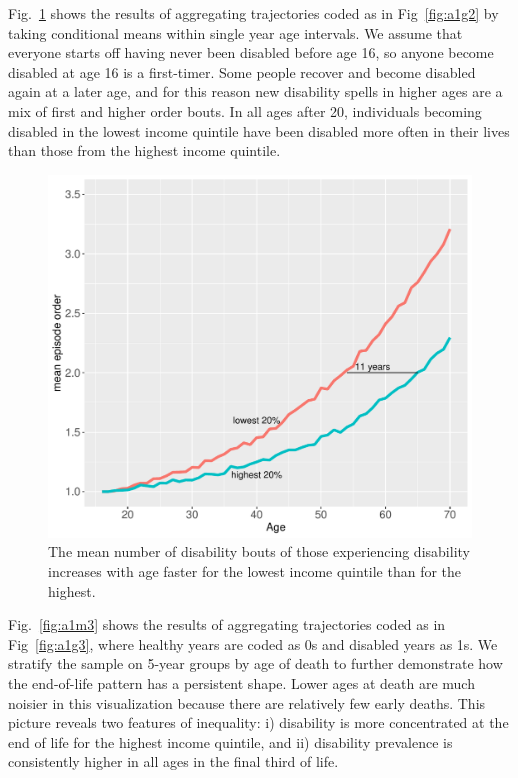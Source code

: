 \documentclass{article}
\begin{document}
Fig.~\ref{fig:a1m2} shows the results of aggregating trajectories coded as in Fig~\ref{fig:a1g2} by taking conditional means within single year age intervals. We assume that everyone starts off having never been disabled before age 16, so anyone become disabled at age 16 is a first-timer. Some people recover and become disabled again at a later age, and for this reason new disability spells in higher ages are a mix of first and higher order bouts. In all ages after 20, individuals becoming disabled in the lowest income quintile have been disabled more often in their lives than those from the highest income quintile.
\begin{figure}
    \centering
    \includegraphics[scale=.6]{Figures/App1_macro2.pdf}
    \caption{The mean number of disability bouts of those experiencing disability increases with age faster for the lowest income quintile than for the highest.}
    \label{fig:a1m2}
\end{figure}

Fig.~\ref{fig:a1m3} shows the results of aggregating trajectories coded as in Fig~\ref{fig:a1g3}, where healthy years are coded as 0s and disabled years as 1s. We stratify the sample on 5-year groups by age of death to further demonstrate how the end-of-life pattern has a persistent shape. Lower ages at death are much noisier in this visualization because there are relatively few early deaths. This picture reveals two features of inequality: i) disability is more concentrated at the end of life for the highest income quintile, and ii) disability prevalence is consistently higher in all ages in the final third of life.
\end{document}
